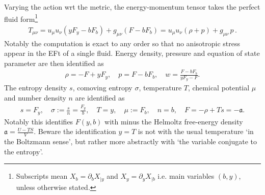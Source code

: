 Varying the action wrt the metric, the energy-momentum tensor takes the perfect fluid form\footnote{Subscripts mean $X_b=\partial_b X_{\mid y}$ and $X_y=\partial_y X_{\mid b}$ i.e. main variables $(b,y)$, unless otherwise stated.}
\begin{align}\label{eq:em_tensor_nonbaro}
    T_{\mu\nu} = u_\mu u_\nu (yF_y - bF_b) + g_{\mu\nu} (F-bF_b) = u_\mu u_\nu(\rho+p) + g_{\mu\nu}\, p\,.
\end{align}
Notably the computation is exact to any order so that no anisotropic stress appear in the EFt of a single fluid.
Energy density, pressure and equation of state parameter are then identified as
\begin{align}\label{eq:thermo_rho_p_nonbaro}
    \rho=-F+yF_y,\quad p=F-bF_b,\quad w=\frac{F-bF_b}{yF_y-F}.
\end{align}
The entropy density $s$, comoving entropy $\sigma$, temperature $T$, chemical potential $\mu$ and number density $n$ are identified as
\begin{align}\label{eq:thermo_other_variables_nonbaro}
    s=F_y,\quad \sigma:=\frac{s}{n}=\frac{F_y}{b},\quad T=y,\quad \mu:=F_b, \quad n=b, \quad F=-\rho+Ts=-\mathfrak{a}.
\end{align}
Notably this identifies $F(y,b)$ with minus the Helmoltz free-energy density {\small $\mathfrak{a}=\frac{U-TS}{V}$.}
Beware the identification $y=T$ is not with the usual temperature `in the Boltzmann sense', but rather more abstractly with `the variable conjugate to the entropy'.

